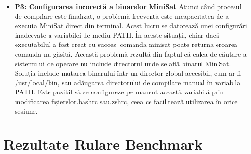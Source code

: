 \documentclass[12pt,a4paper]{report}
\begin{document}
\begin{itemize}
\item \textbf{P3: Configurarea incorectă a binarelor MiniSat} 
Atunci când procesul de compilare este finalizat, o problemă frecventă este incapacitatea de a executa MiniSat direct din terminal. Acest lucru se datorează unei configurări inadecvate a variabilei de mediu PATH. În aceste situații, chiar dacă executabilul a fost creat cu succes, comanda minisat poate returna eroarea comanda nu găsită. Această problemă rezultă din faptul că calea de căutare a sistemului de operare nu include directorul unde se află binarul MiniSat. Soluția include mutarea binarului într-un director global accesibil, cum ar fi /usr/local/bin, sau adăugarea directorului de compilare manual în variabila PATH. Este posibil să se configureze permanent această variabilă prin modificarea fișierelor.bashrc sau.zshrc, ceea ce facilitează utilizarea în orice sesiune.

\end{itemize}


\chapter{Rezultate Rulare Benchmark}
\end{document}
